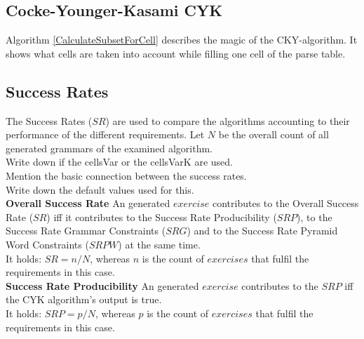 \pagebreak
\subsection{ Cocke-Younger-Kasami CYK}


Algorithm \ref{CalculateSubsetForCell} describes the magic of the CKY-algorithm. It shows what cells are taken into account while filling one cell of the parse table.

\pagebreak
\subsection{Success Rates}
\noindent The Success Rates ($SR$) are used to compare the algorithms accounting to their performance of the different requirements. Let $N$ be the overall count of all generated grammars of the examined algorithm.\\

\noindent Write down if the cellsVar or the cellsVarK are used.\\
Mention the basic connection between the success rates.\\
Write down the default values used for this.\\


\noindent\textbf{Overall Success Rate}
An generated $exercise$ contributes to the Overall Success Rate ($SR$) iff it contributes to the Success Rate Producibility ($SRP$), to the Success Rate Grammar Constraints ($SRG$) and to the Success Rate Pyramid Word Constraints ($SRPW$) at the same time.\\
It holds: $SR = n / N$, whereas $n$ is the count of $exercises$ that fulfil the requirements in this case.\\

\noindent\textbf{Success Rate Producibility}
An generated $exercise$ contributes to the $SRP$ iff the CYK algorithm's output is true.\\
It holds: $SRP = p / N$, whereas $p$ is the count of $exercises$ that fulfil the requirements in this case.\\

